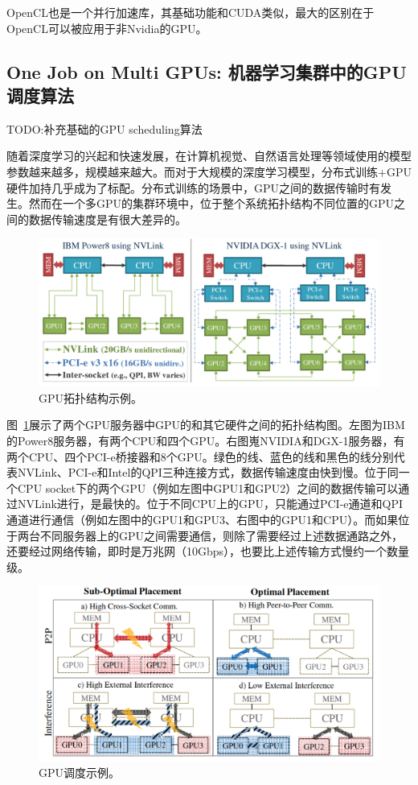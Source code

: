 OpenCL也是一个并行加速库，其基础功能和CUDA类似，最大的区别在于OpenCL可以被应用于非Nvidia的GPU。

\subsection{One Job on Multi GPUs: 机器学习集群中的GPU调度算法}

TODO:补充基础的GPU scheduling算法

随着深度学习的兴起和快速发展，在计算机视觉、自然语言处理等领域使用的模型参数越来越多，规模越来越大。而对于大规模的深度学习模型，分布式训练+GPU硬件加持几乎成为了标配。分布式训练的场景中，GPU之间的数据传输时有发生。然而在一个多GPU的集群环境中，位于整个系统拓扑结构不同位置的GPU之间的数据传输速度是有很大差异的。

\begin{figure}[h]
    \centerline{\includegraphics[width=\textwidth]{figures/gpu-topology.png}}
    \caption{GPU拓扑结构示例。}
    \label{gpu_topology}
\end{figure}

图~\ref{gpu_topology}展示了两个GPU服务器中GPU的和其它硬件之间的拓扑结构图。左图为IBM的Power8服务器，有两个CPU和四个GPU。右图嵬NVIDIA和DGX-1服务器，有两个CPU、四个PCI-e桥接器和8个GPU。绿色的线、蓝色的线和黑色的线分别代表NVLink、PCI-e和Intel的QPI三种连接方式，数据传输速度由快到慢。位于同一个CPU socket下的两个GPU（例如左图中GPU1和GPU2）之间的数据传输可以通过NVLink进行，是最快的。位于不同CPU上的GPU，只能通过PCI-e通道和QPI通道进行通信（例如左图中的GPU1和GPU3、右图中的GPU1和CPU）。而如果位于两台不同服务器上的GPU之间需要通信，则除了需要经过上述数据通路之外，还要经过网络传输，即时是万兆网（10Gbps），也要比上述传输方式慢约一个数量级。

\begin{figure}[h]
    \centerline{\includegraphics[width=\textwidth]{figures/gpu-top-sub-opt.png}}
    \caption{GPU调度示例。}
    \label{gpu_top_sub_opt}
\end{figure}

